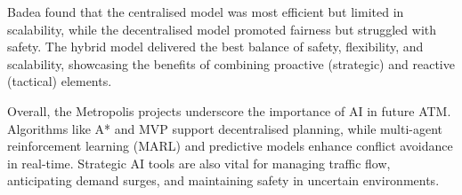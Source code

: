 Badea \cite{Badea_2022} found that the centralised model was most efficient but limited in scalability, while the decentralised model promoted fairness but struggled with safety. 
The hybrid model delivered the best balance of safety, flexibility, and scalability, showcasing the benefits of combining proactive (strategic) and reactive (tactical) elements.





Overall, the Metropolis projects underscore the importance of \gls{AI} in future \gls{ATM}. 
Algorithms like A* and \gls{MVP} support decentralised planning, while multi-agent reinforcement learning (MARL) and predictive models enhance conflict avoidance in real-time. 
Strategic \gls{AI} tools are also vital for managing traffic flow, anticipating demand surges, and maintaining safety in uncertain environments.


